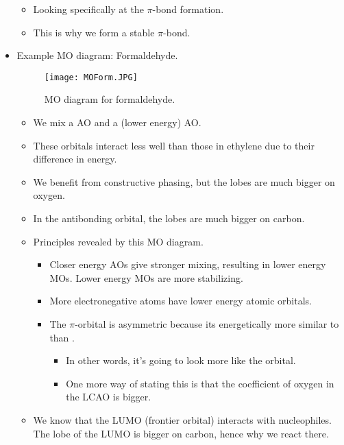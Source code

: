 \documentclass[../notes.tex]{subfiles}
\begin{document}
\begin{itemize}
\begin{figure}[H]
        \label{fig:MOEtH}
    \end{figure}
    \begin{itemize}
        \item Looking specifically at the $\pi$-bond formation.
        \item This is why we form a stable $\pi$-bond.
    \end{itemize}
    \item Example MO diagram: Formaldehyde.
    \begin{figure}[h!]
        \centering
        \texttt{[image: MOForm.JPG]}
        \caption{MO diagram for formaldehyde.}
        \label{fig:MOForm}
    \end{figure}
    \begin{itemize}
        \item We mix a  AO and a (lower energy)  AO.
        \item These orbitals interact less well than those in ethylene due to their difference in energy.
        \item We benefit from constructive phasing, but the lobes are much bigger on oxygen.
        \item In the antibonding orbital, the lobes are much bigger on carbon.
        \item Principles revealed by this MO diagram.
        \begin{itemize}
            \item Closer energy AOs give stronger mixing, resulting in lower energy MOs. Lower energy MOs are more stabilizing.
            \item More electronegative atoms have lower energy atomic orbitals.
            \item The $\pi$-orbital is asymmetric because its energetically more similar to  than .
            \begin{itemize}
                \item In other words, it's going to look more like the  orbital.
                \item One more way of stating this is that the coefficient of oxygen in the LCAO is bigger.
            \end{itemize}
        \end{itemize}
        \item We know that the LUMO (frontier orbital) interacts with nucleophiles. The lobe of the LUMO is bigger on carbon, hence why we react there.

\end{itemize}
\end{itemize}
\end{document}
